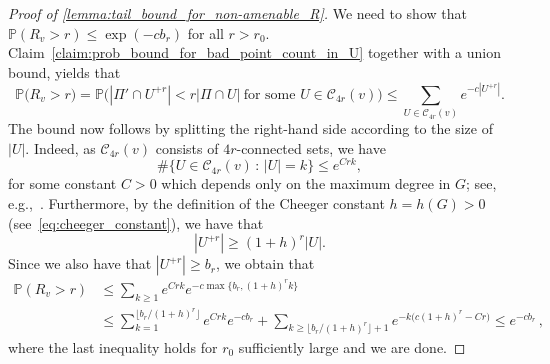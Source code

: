 \documentclass[11pt, reqno]{article}
\numberwithin{equation}{section}
\theoremstyle{definition}
\def\cC{\mathcal{C}}
\def\P{\mathbb{P}}
\newcommand{\1}{\mathds{1}}
\begin{document}
\begin{proof}[Proof of \cref{lemma:tail_bound_for_non-amenable_R}]
    We need to show that $\P(R_v > r) \le \exp(-cb_r)$ for all $r>r_0$. Claim~\ref{claim:prob_bound_for_bad_point_count_in_U} together with a union bound, yields that
    \[ \P\big(R_v > r\big) = \P\big(|\Pi'\cap U^{+r}| < r |\Pi \cap U| \ \text{for some } U\in \cC_{4r}(v)\big) \le \sum_{U \in \cC_{4r}(v)} e^{-c|U^{+r}|} .\]
    The bound now follows by splitting the right-hand side according to the size of $|U|$. Indeed, as $\cC_{4r}(v)$ consists of $4r$-connected sets, we have 
     \begin{equation}
         \label{eq:exponential_bound_on_connected_sets_of_given_size}
         \# \{ U\in \cC_{4r}(v) \, : \, |U| = k \} \le e^{Crk},
     \end{equation} 
     for some constant $C>0$ which depends only on the maximum degree in $G$; 
     see, e.g.,~\cite[Chapter 45]{bollobas2006art}. Furthermore, by the definition of the Cheeger constant $h=h(G)>0$ (see~\eqref{eq:cheeger_constant}), we have that
    \[
    |U^{+r}| \ge (1+h)^r |U| .
    \]
    Since we also have that $|U^{+r}| \ge b_r$, we obtain that
    \begin{align*}
     \P(R_v > r) &\le \sum_{k\ge 1} e^{Crk} e^{-c\max\{b_r , (1+h)^r k \}} \\ &\le \sum_{k=1}^{\lfloor b_r/(1+h)^r\rfloor } e^{Crk}  e^{-cb_r} + \sum_{k\ge \lfloor b_r/(1+h)^r\rfloor + 1}e^{-k\big(c(1+h)^r-Cr
     \big)} \le e^{-cb_r} \, ,
    \end{align*}
    where the last inequality holds for $r_0$ sufficiently large and we are done.
\end{proof}
\end{document}
